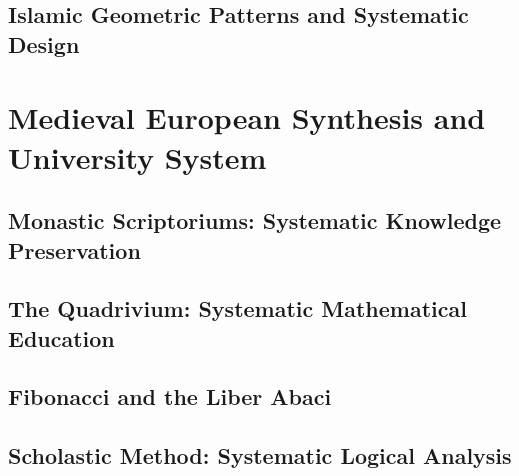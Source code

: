 \documentclass[12pt, oneside, openany]{book}
\begin{document}
\section{Islamic Geometric Patterns and Systematic Design}


\chapter{Medieval European Synthesis and University System}

\section{Monastic Scriptoriums: Systematic Knowledge Preservation}

\section{The Quadrivium: Systematic Mathematical Education}

\section{Fibonacci and the Liber Abaci}

\section{Scholastic Method: Systematic Logical Analysis}

\end{document}
